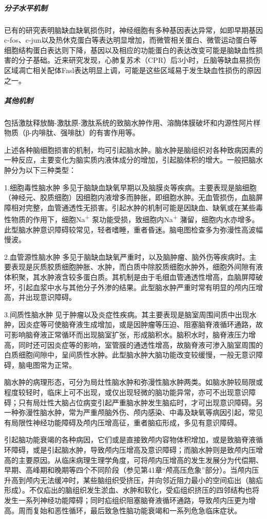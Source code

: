 \subparagraph{分子水平机制}

已有的研究表明脑缺血缺氧损伤时，神经细胞有多种基因表达异常，如即早期基因c-fos、c-jun以及热休克蛋白等表达明显增加，而微管相关蛋白、微管运动蛋白等细胞结构蛋白表达则下降，基因以及相应的功能蛋白的表达改变可能是脑缺血性损害的分子基础。近来研究发现，心肺复苏术（CPR）后3小时，丘脑等缺血易损伤区域凋亡相关配体Fasl表达明显上调，可能是这些区域易于发生缺血性损伤的原因之一。

\subparagraph{其他机制}

包括激肽释放酶-激肽原-激肽系统的致脑水肿作用、溶酶体膜破坏和内源性阿片样物质（β-内啡肽、强啡肽）的有害作用等。

上述各种脑细胞损害的机制，均可引起脑水肿。脑水肿是脑组织对各种致病因素的一种反应，主要变化为脑实质内液体成分的增加，引起脑体积的增大。一般把脑水肿分为以下三种类型：

1.细胞毒性脑水肿
多见于脑缺血缺氧早期以及脑膜炎等疾病。主要表现是脑细胞（神经元、胶质细胞）因细胞内液增多而肿胀，即细胞水肿。无血管损伤，血脑屏障相对完整，血管通透性无损害。引起水肿的机制可能是因缺血、缺氧或在某些毒性物质的作用下，细胞Na\textsuperscript{+}
泵功能受损，致细胞内Na\textsuperscript{+}
潴留，细胞内水亦增多。此型脑水肿意识障碍较常见，轻者嗜睡，重者昏迷。脑电图检查多为弥漫性高波幅慢波。

2.血管源性脑水肿
多见于脑缺血缺氧严重时，以及脑肿瘤、脑外伤等疾病时。主要表现是灰质胶质细胞肿胀、水肿，而白质中除胶质细胞水肿外，细胞外间隙有液体积聚，其水肿液含较多蛋白质。其机制是由于毛细血管通透性增高，血脑屏障破坏，引起血浆中水与其他分子外渗的结果。此型脑水肿严重时常有明显的颅内压增高，并出现意识障碍。

3.间质性脑水肿
见于肿瘤以及炎症性疾病。其主要表现是脑室周围间质中出现水肿，因炎症等可使脑脊液生成增加，或是因肿瘤等压迫、阻塞脑脊液循环通路，故可影响脑脊液正常循环而出现脑室扩张，形成脑积水。脑积水时，脑脊液压力增高，同时还可因炎症等的影响，室管膜的通透性增高，故脑脊液可渗入脑室周围的白质细胞间隙中，呈间质性水肿。此型脑水肿大脑功能改变较缓慢，一般无意识障碍，脑电图常为正常。

脑水肿的病理形态，可分为局灶性脑水肿和弥漫性脑水肿两类。如脑水肿较局限或程度较轻时，临床上可不出现，或仅出现轻微的脑功能异常，亦可不出现意识障碍；只有局灶性大脑占位病变引起严重脑水肿发生脑疝时，才可出现意识障碍。另一种弥漫性脑水肿，常为严重颅脑外伤、颅内感染、中毒及缺氧等病因引起，常见有局限性神经功能障碍及颅内压增高征，重者脑疝形成，多见有意识障碍。

引起脑功能衰竭的各种病因，它们或是直接致颅内容物体积增加，或是致脑脊液循环障碍，或是引起脑水肿，导致颅内压增高及意识障碍；而脑水肿则是致颅内压增高的主要原因。从临床病理生理学角度，可将颅内压增高的发生发展分为代偿期、早期、高峰期和晚期等四个不同阶段（参见第41章“颅高压危象”部分）。当颅内压升高到颅内无法缓冲时，某些脑组织受挤压，并向邻近阻力最小的空间疝出（脑疝形成）。不仅疝出的脑组织发生淤血、水肿和软化，受疝组织挤压的四邻结构也将发生一系列神经功能障碍；同时疝组织阻塞脑脊液循环通路，导致颅内压更为增高。周而复始和恶性循环，最后致急性脑功能衰竭和一系列危急临床症状。

